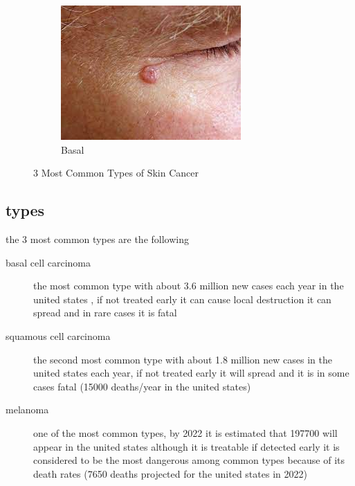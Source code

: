 \begin{figure}[h]
            \begin{subfigure}[b]{0.3\textwidth}
                \centering
                \includegraphics[scale=.5]{./chapter-01-general-medical-information/basal.jpeg}
                \caption{Basal ~\cite{epr2021}}
                \label{fig:basal}
            \end{subfigure}
        \caption{3 Most Common Types of Skin Cancer}
        \label{fig:3types}
        \end{figure}


    \subsection{types}
        the 3 most common types are the following ~\cite{scf2022}
        \begin{description}
        \item[basal cell carcinoma]
            the most common type with about 3.6 million new cases each year in the united states , if not treated early it can cause local destruction it can spread and in rare cases it is fatal 
        \item[squamous cell carcinoma]
            the second most common type with about 1.8 million new cases in the united states each year, if not treated early it will spread and it is in some cases fatal (15000 deaths/year in the united states)
        \item[melanoma]
            one of the most common types, by 2022 it is estimated that 197700 will appear in the united states although it is treatable if detected early it is considered to be the most dangerous among common types because of its death rates (7650 deaths projected for the united states in 2022)
        \end{description}




